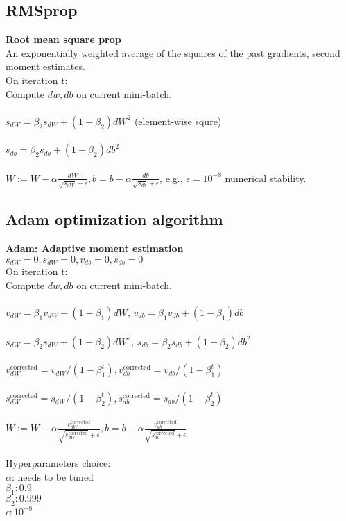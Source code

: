 %
\subsection{RMSprop}
\textbf{Root mean square prop}
\\
An exponentially weighted average of the squares of the past gradients, second moment estimates.
\\
On iteration t:
\\
\indent Compute $dw, db$ on current mini-batch.\\\\
\indent $\displaystyle s_{dW} = \beta_2 s_{dW} + (1-\beta_2)dW^2$ (element-wise squre)\\\\
\indent $\displaystyle s_{db} = \beta_2 s_{db} + (1-\beta_2)db^2$ \\\\
\indent $\displaystyle W := W-\alpha \frac{dW}{\sqrt{s_{dW}}+\epsilon}, b = b - \alpha \frac{db}{\sqrt{s_{db}}+\epsilon}$, e.g., $\epsilon = 10^{-8}$ numerical stability.

%
\subsection{Adam optimization algorithm}
\textbf{Adam: Adaptive moment estimation}
\\
$s_{dW} = 0, s_{dW} = 0, v_{db} = 0, s_{db} = 0$\\
On iteration t:\\
\indent Compute $dw, db$ on current mini-batch.\\
\\
\indent $\displaystyle v_{dW} = \beta_1 v_{dW} + (1-\beta_1)dW$,
            $\displaystyle v_{db} = \beta_1 v_{db} + (1-\beta_1)db$\\\\
\indent $\displaystyle s_{dW} = \beta_2 s_{dW} + (1-\beta_2)dW^2$,
            $\displaystyle s_{db} = \beta_2 s_{db} + (1-\beta_2)db^2$ \\\\
\indent $\displaystyle v_{dW}^{\text{corrected}} = v_{dW}/(1-\beta^t_1),
                v_{db}^{\text{corrected}} = v_{db}/(1-\beta^t_1)$\\\\
\indent $\displaystyle s_{dW}^{\text{corrected}} = s_{dW}/(1-\beta^t_2),
                s_{db}^{\text{corrected}} = s_{db}/(1-\beta^t_2)$\\\\
\indent $\displaystyle W := W-\alpha \frac{v_{dW}^{\text{corrected}}}{\sqrt{s_{dW}^{\text{corrected}} }+\epsilon},
                b = b - \alpha \frac{v_{db}^{\text{corrected}}}{\sqrt{s_{db}^{\text{corrected}}}+\epsilon}$\\
\\
Hyperparameters choice:\\
$\alpha$: needs to be tuned\\
$\beta_1: 0.9$\\
$\beta_2: 0.999$\\
$\epsilon: 10^{-8}$

